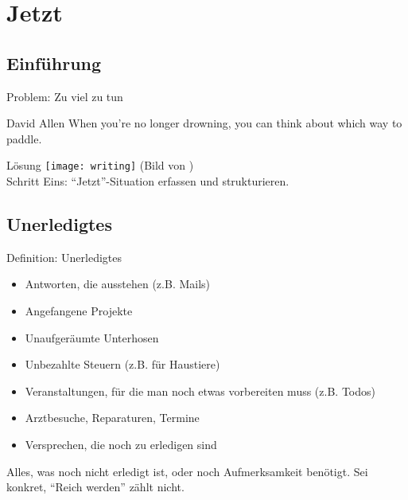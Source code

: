 \section{Jetzt}

\subsection{Einführung}

\begin{frame}[c]{Problem: Zu viel zu tun}
    \large
    \begin{aquote}{David Allen}
        When you're no longer drowning, you can think about which way to
        paddle.
    \end{aquote}
\end{frame}


\begin{frame}[c]{Lösung}
    \texttt{[image: writing]} (Bild von \cite{writing-pic}) \\
    \vspace{0.5cm}
    Schritt Eins: \enquote{Jetzt}-Situation erfassen und strukturieren.
\end{frame}


\subsection{Unerledigtes}

\begin{frame}[c]{Definition: Unerledigtes}
    \begin{itemize}[<+(1)->]
        \item Antworten, die ausstehen (z.B. Mails)
        \item Angefangene Projekte
        \item Unaufgeräumte Unterhosen
        \item Unbezahlte Steuern (z.B. für Haustiere)
        \item Veranstaltungen, für die man noch etwas vorbereiten muss (z.B. Todos)
        \item Arztbesuche, Reparaturen, Termine
        \item Versprechen, die noch zu erledigen sind
    \end{itemize}
    \pause
    Alles, was noch nicht erledigt ist, oder noch Aufmerksamkeit
    benötigt. Sei konkret, \enquote{Reich werden} zählt nicht.
\end{frame}


